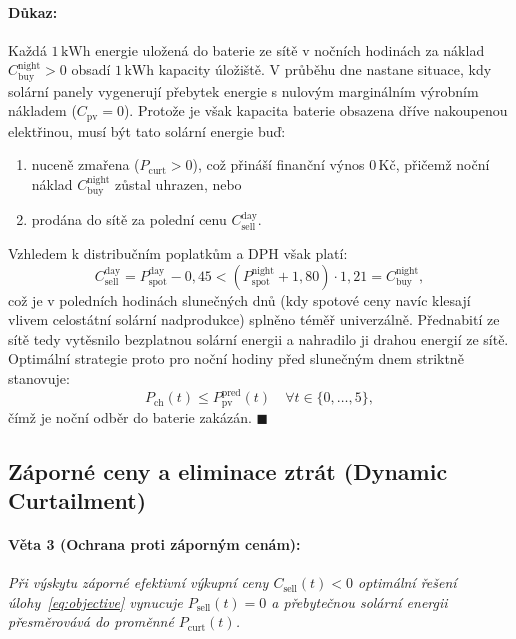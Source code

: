 \documentclass[FM,BP]{tulthesis}
\begin{document}
	\paragraph{Důkaz:}
	Každá $1\,\text{kWh}$ energie uložená do baterie ze sítě v nočních hodinách za náklad $C_{\text{buy}}^{\text{night}} > 0$ obsadí $1\,\text{kWh}$ kapacity úložiště.
	V průběhu dne nastane situace, kdy solární panely vygenerují přebytek energie s nulovým marginálním výrobním nákladem ($C_{\text{pv}} = 0$). Protože je však kapacita baterie obsazena dříve nakoupenou elektřinou, musí být tato solární energie buď:
	\begin{enumerate}
		\item nuceně zmařena ($P_{\text{curt}} > 0$), což přináší finanční výnos $0\,\text{Kč}$, přičemž noční náklad $C_{\text{buy}}^{\text{night}}$ zůstal uhrazen, nebo
		\item prodána do sítě za polední cenu $C_{\text{sell}}^{\text{day}}$.
	\end{enumerate}
	Vzhledem k distribučním poplatkům a DPH však platí:
	\begin{equation}
		C_{\text{sell}}^{\text{day}} = P_{\text{spot}}^{\text{day}} - 0{,}45 < (P_{\text{spot}}^{\text{night}} + 1{,}80) \cdot 1{,}21 = C_{\text{buy}}^{\text{night}},
	\end{equation}
	což je v poledních hodinách slunečných dnů (kdy spotové ceny navíc klesají vlivem celostátní solární nadprodukce) splněno téměř univerzálně.
	Přednabití ze sítě tedy vytěsnilo bezplatnou solární energii a nahradilo ji drahou energií ze sítě. Optimální strategie proto pro noční hodiny před slunečným dnem striktně stanovuje:
	\begin{equation}
		P_{\text{ch}}(t) \le P_{\text{pv}}^{\text{pred}}(t) \quad \forall t \in \{0, \dots, 5\},
	\end{equation}
	čímž je noční odběr do baterie zakázán. \hfill $\blacksquare$

	\subsection{Záporné ceny a eliminace ztrát (Dynamic Curtailment)}

	\paragraph{Věta 3 (Ochrana proti záporným cenám):}
	\textit{Při výskytu záporné efektivní výkupní ceny $C_{\text{sell}}(t) < 0$ optimální řešení úlohy~\eqref{eq:objective} vynucuje $P_{\text{sell}}(t) = 0$ a přebytečnou solární energii přesměrovává do proměnné $P_{\text{curt}}(t)$.}
\end{document}
